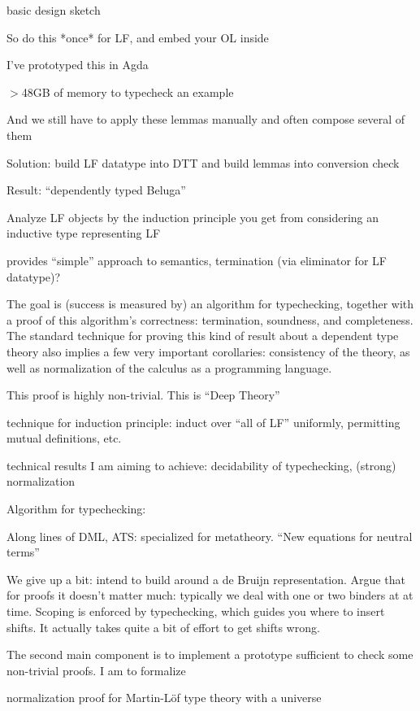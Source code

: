 \documentclass{article}
\begin{document}
basic design sketch

So do this *once* for LF, and embed your OL inside

I've prototyped this in Agda

$>$48GB of memory to typecheck an example

And we still have to apply these lemmas manually and often compose several of them

Solution: build LF datatype into DTT and build lemmas into conversion check

Result: ``dependently typed Beluga''

Analyze LF objects by the induction principle you get from considering an inductive type representing LF

provides ``simple'' approach to semantics, termination (via eliminator for LF datatype)?

The goal is (success is measured by) an algorithm for typechecking,
together with a proof of this algorithm's correctness: termination,
soundness, and completeness. The standard technique for proving this
kind of result about a dependent type theory also implies a few very
important corollaries: consistency of the theory, as well as
normalization of the calculus as a programming language.

This proof is highly non-trivial. This is ``Deep Theory''

technique for induction principle: induct over ``all of LF'' uniformly, permitting mutual definitions, etc.

technical results I am aiming to achieve: decidability
  of typechecking, (strong) normalization

Algorithm for typechecking: \citep{Coquand91,Harper05,Abel11}

Along lines of DML, ATS: specialized for metatheory. ``New equations
for neutral terms'' \cite{Allais13}


We give up a bit: intend to build around a de Bruijn
representation. Argue that for proofs it doesn't matter much:
typically we deal with one or two binders at at time. Scoping is
enforced by typechecking, which guides you where to insert
shifts. It actually takes quite a bit of effort to get shifts wrong. 

The second main component is to implement a prototype sufficient to
check some non-trivial proofs. I am to formalize 

\cite{Coquand98} normalization proof for Martin-L\"of type theory with a universe
\end{document}
